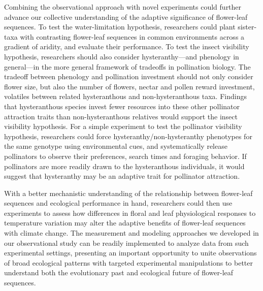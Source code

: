 \documentclass{article}[12pt]
\begin{document}
{Combining the observational approach with novel experiments could further advance our collective understanding of the adaptive significance of flower-leaf sequences. To test the water-limitation hypothesis, researchers could plant sister-taxa with contrasting flower-leaf sequences in common environments across a gradient of aridity, and evaluate their performance. To test the insect visibility hypothesis, researchers should also consider hysteranthy---and phenology in general---in the more general framework of tradeoffs in pollination biology. The tradeoff between phenology and pollination investment should not only consider flower size, but also the number of flowers, nectar and pollen reward investment, volatiles between related hysteranthous and non-hysteranthous taxa. Findings that hysteranthous species invest fewer resources into these other pollinator attraction traits than non-hysteranthous relatives would support the insect visibility hypothesis. For a simple experiment to test the pollinator visibility hypothesis, researchers could force hysteranthy/non-hysteranthy phenotypes for the same genotype using environmental cues, and systematically release pollinators to observe their preferences, search times and foraging behavior. If pollinators are more readily drawn to the hysteranthous individuals, it would suggest that hysteranthy may be an adaptive trait for pollinator attraction. %

With a better mechanistic understanding of the relationship between flower-leaf sequences and ecological performance in hand, researchers could then use experiments to assess how differences in floral and leaf physiological responses to temperature variation may alter the adaptive benefits of flower-leaf sequences with climate change. The measurement and modeling approaches we developed in our observational study can be readily implemented to analyze data from such experimental settings, presenting an important opportunity to unite observations of broad ecological patterns with targeted experimental manipulations to better understand both the evolutionary past and ecological future of flower-leaf sequences.


}
\end{document}
